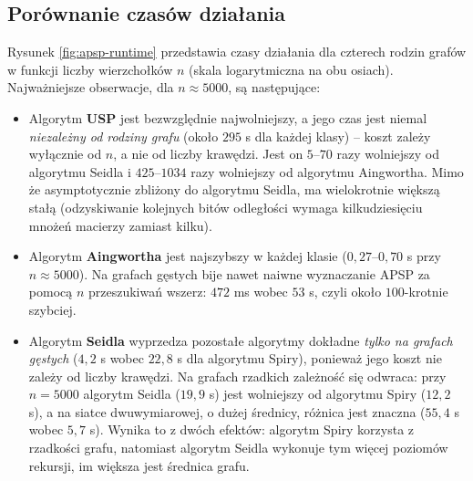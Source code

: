\subsection{Porównanie czasów działania}

Rysunek \ref{fig:apsp-runtime} przedstawia czasy działania dla czterech rodzin
grafów w funkcji liczby wierzchołków $n$ (skala logarytmiczna na obu osiach).
Najważniejsze obserwacje, dla $n \approx 5000$, są następujące:

\begin{itemize}
    \item Algorytm \textbf{USP} jest bezwzględnie najwolniejszy, a jego czas jest
        niemal \emph{niezależny od rodziny grafu} (około $295$ s dla każdej klasy)
        -- koszt zależy wyłącznie od $n$, a nie od liczby krawędzi. Jest on
        $5$--$70$ razy wolniejszy od algorytmu Seidla i $425$--$1034$ razy wolniejszy
        od algorytmu Aingwortha. Mimo że asymptotycznie zbliżony do algorytmu Seidla,
        ma wielokrotnie większą stałą (odzyskiwanie kolejnych bitów odległości
        wymaga kilkudziesięciu mnożeń macierzy zamiast kilku).

    \item Algorytm \textbf{Aingwortha} jest najszybszy w każdej klasie
        ($0{,}27$--$0{,}70$ s przy $n \approx 5000$). Na grafach gęstych bije nawet
        naiwne wyznaczanie APSP za pomocą $n$ przeszukiwań wszerz: $472$ ms wobec
        $53$ s, czyli około $100$-krotnie szybciej.

    \item Algorytm \textbf{Seidla} wyprzedza pozostałe algorytmy dokładne
        \emph{tylko na grafach gęstych} ($4{,}2$ s wobec $22{,}8$ s dla algorytmu
        Spiry), ponieważ jego koszt nie zależy od liczby krawędzi. Na grafach
        rzadkich zależność się odwraca: przy $n=5000$ algorytm Seidla ($19{,}9$ s)
        jest wolniejszy od algorytmu Spiry ($12{,}2$ s), a na siatce dwuwymiarowej,
        o dużej średnicy, różnica jest znaczna ($55{,}4$ s wobec $5{,}7$ s). Wynika
        to z dwóch efektów: algorytm Spiry korzysta z rzadkości grafu, natomiast
        algorytm Seidla wykonuje tym więcej poziomów rekursji, im większa jest
        średnica grafu.
\end{itemize}

